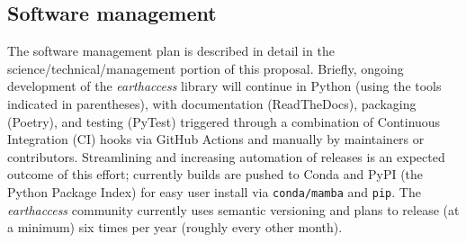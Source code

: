 

\subsection{Software management}

The software management plan is described in detail in the science/technical/management portion of this proposal. Briefly, ongoing development of the \textit{earthaccess} library will continue in Python (using the tools indicated in parentheses), with documentation (ReadTheDocs), packaging (Poetry), and testing (PyTest) triggered through a combination of Continuous Integration (CI) hooks via GitHub Actions and manually by maintainers or contributors. Streamlining and increasing automation of releases is an expected outcome of this effort; currently builds are pushed to Conda and PyPI (the Python Package Index) for easy user install via \texttt{conda/mamba} and \texttt{pip}. The \textit{earthaccess} community currently uses semantic versioning and plans to release (at a minimum) six times per year (roughly every other month).




